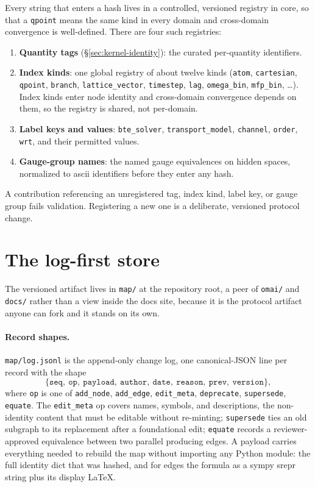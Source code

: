 \documentclass[11pt,a4paper]{article}
\begin{document}
Every string that enters a hash lives in a controlled, versioned registry in
core, so that a \texttt{qpoint} means the same kind in every domain and
cross-domain convergence is well-defined. There are four such registries:
\begin{enumerate}[leftmargin=2em, itemsep=0.2em]
  \item \textbf{Quantity tags} (\S\ref{sec:kernel-identity}): the curated
        per-quantity identifiers.
  \item \textbf{Index kinds}: one global registry of about twelve kinds
        (\texttt{atom}, \texttt{cartesian}, \texttt{qpoint}, \texttt{branch},
        \texttt{lattice\_vector}, \texttt{timestep}, \texttt{lag},
        \texttt{omega\_bin}, \texttt{mfp\_bin}, \ldots). Index kinds enter node
        identity and cross-domain convergence depends on them, so the registry is
        shared, not per-domain.
  \item \textbf{Label keys and values}: \texttt{bte\_solver},
        \texttt{transport\_model}, \texttt{channel}, \texttt{order}, \texttt{wrt},
        and their permitted values.
  \item \textbf{Gauge-group names}: the named gauge equivalences on hidden spaces,
        normalized to ascii identifiers before they enter any hash.
\end{enumerate}
A contribution referencing an unregistered tag, index kind, label key, or gauge
group fails validation. Registering a new one is a deliberate, versioned protocol
change.

\section{The log-first store}
\label{sec:kernel-store}

The versioned artifact lives in \texttt{map/} at the repository root, a peer of
\texttt{omai/} and \texttt{docs/} rather than a view inside the docs site, because
it is the protocol artifact anyone can fork and it stands on its own.

\paragraph{Record shapes.} \texttt{map/log.jsonl} is the append-only change log,
one canonical-JSON line per record with the shape
\[
  \{\texttt{seq},\ \texttt{op},\ \texttt{payload},\ \texttt{author},\ \texttt{date},\ \texttt{reason},\ \texttt{prev},\ \texttt{version}\},
\]
where \texttt{op} is one of \texttt{add\_node}, \texttt{add\_edge},
\texttt{edit\_meta}, \texttt{deprecate}, \texttt{supersede}, \texttt{equate}. The
\texttt{edit\_meta} op covers names, symbols, and descriptions, the non-identity
content that must be editable without re-minting; \texttt{supersede} ties an old
subgraph to its replacement after a foundational edit; \texttt{equate} records a
reviewer-approved equivalence between two parallel producing edges. A payload
carries everything needed to rebuild the map without importing any Python module:
the full identity dict that was hashed, and for edges the formula as a sympy
srepr string plus its display LaTeX.
\end{document}
